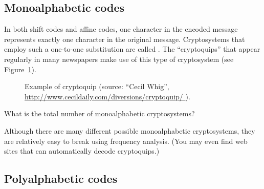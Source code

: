 \subsection{Monoalphabetic codes}
\label{subsec:Cryptography:PrivateKey:MonoalphabeticCode}

In both shift codes and affine codes, one character in the encoded message represents exactly one character in the original message. Cryptosystems that employ such a one-to-one substitution are called .
The ``cryptoquips''  that appear regularly in many newspapers make use of this type of cryptosystem (see Figure~\ref{fig:cryptoquip}).

\begin{figure}[h]
\caption{Example of cryptoquip (source: ``Cecil Whig'', \url{http://www.cecildaily.com/diversions/cryptoquip/ }).}
\label{fig:cryptoquip}
\end{figure}

\begin{exercise}{}
What is the total number of monoalphabetic cryptosystems?
\end{exercise}
Although there are many different possible monoalphabetic cryptosystems, they are relatively easy to break using frequency analysis. (You may even find web sites that can automatically decode cryptoquips.)


\subsection{Polyalphabetic codes}
\label{subsec:Cryptography:PrivateKey:PolyCodes}

